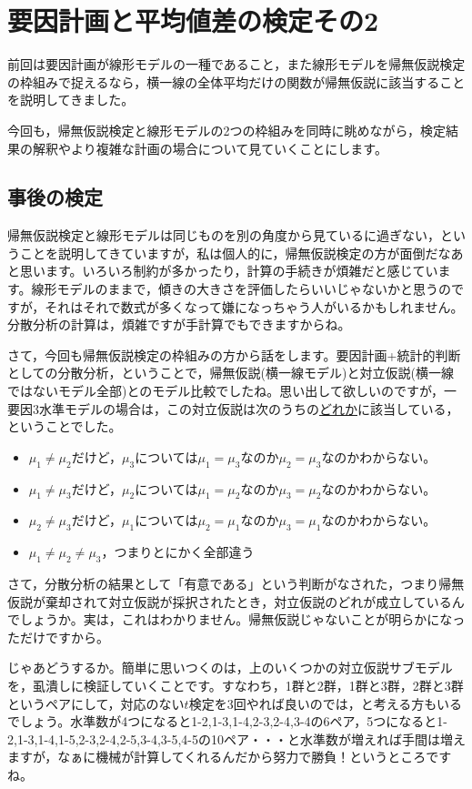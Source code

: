 \documentclass{ltjsarticle}
\begin{document}
\chapter{要因計画と平均値差の検定その2}
\label{chapter22}
前回は要因計画が線形モデルの一種であること，また線形モデルを帰無仮説検定の枠組みで捉えるなら，横一線の全体平均だけの関数が帰無仮説に該当することを説明してきました。

今回も，帰無仮説検定と線形モデルの2つの枠組みを同時に眺めながら，検定結果の解釈やより複雑な計画の場合について見ていくことにします。
\section{事後の検定}
帰無仮説検定と線形モデルは同じものを別の角度から見ているに過ぎない，ということを説明してきていますが，私は個人的に，帰無仮説検定の方が面倒だなあと思います。いろいろ制約が多かったり，計算の手続きが煩雑だと感じています。線形モデルのままで，傾きの大きさを評価したらいいじゃないかと思うのですが，それはそれで数式が多くなって嫌になっちゃう人がいるかもしれません。分散分析の計算は，煩雑ですが手計算でもできますからね。

さて，今回も帰無仮説検定の枠組みの方から話をします。要因計画+統計的判断としての分散分析，ということで，帰無仮説(横一線モデル)と対立仮説(横一線ではないモデル全部)とのモデル比較でしたね。思い出して欲しいのですが，一要因3水準モデルの場合は，この対立仮説は次のうちの\underline{どれか}に該当している，ということでした。
\begin{itemize}
    \item $\mu_1 \neq \mu_2$だけど，$\mu_3$については$\mu_1=\mu_3$なのか$\mu_2=\mu_3$なのかわからない。
    \item $\mu_1 \neq \mu_3$だけど，$\mu_2$については$\mu_1=\mu_2$なのか$\mu_3=\mu_2$なのかわからない。
    \item $\mu_2 \neq \mu_3$だけど，$\mu_1$については$\mu_2=\mu_1$なのか$\mu_3=\mu_1$なのかわからない。
    \item $\mu_1 \neq \mu_2 \neq \mu_3$，つまりとにかく全部違う
\end{itemize}
さて，分散分析の結果として「有意である」という判断がなされた，つまり帰無仮説が棄却されて対立仮説が採択されたとき，対立仮説のどれが成立しているんでしょうか。実は，これはわかりません。帰無仮説じゃないことが明らかになっただけですから。

じゃあどうするか。簡単に思いつくのは，上のいくつかの対立仮説サブモデルを，虱潰しに検証していくことです。すなわち，1群と2群，1群と3群，2群と3群というペアにして，対応のない$t$検定を3回やれば良いのでは，と考える方もいるでしょう。水準数が4つになると1-2,1-3,1-4,2-3,2-4,3-4の6ペア，5つになると1-2,1-3,1-4,1-5,2-3,2-4,2-5,3-4,3-5,4-5の10ペア・・・と水準数が増えれば手間は増えますが，なぁに機械が計算してくれるんだから努力で勝負！というところですね。
\end{document}
